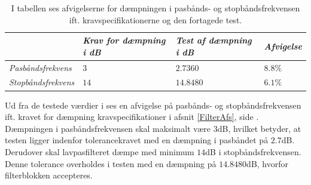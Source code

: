 \begin{table}[H]
	\centering
	\begin{tabular}{|l|l|l|l|}
		\hline
		& \textit{Krav for dæmpning i dB} 	& \textit{Test af dæmpning i dB}  &\textit{Afvigelse} \\ \hline
		\textit{Pasbåndsfrekvens} & $3$	& $2.7360$	    & $8.8\%$ \\ \hline
		\textit{Stopbåndsfrekvens} & $14$    & $14.8480$    & $6.1\%$  \\ \hline
	\end{tabular}
	\caption{I tabellen ses afvigelserne for dæmpningen i pasbånds- og stopbåndsfrekvensen ift. kravspecifikationerne og den fortagede test.}
	\label{Tab:Tolerance}
\end{table}
\noindent Ud fra de testede værdier i  ses en afvigelse på pasbånds- og stopbåndsfrekvensen ift. kravet for dæmpning kravspecifikationer i afsnit \ref{FilterAfs}, side \pageref{FilterAfs}. Dæmpningen i pasbåndsfrekvensen skal maksimalt være $3$dB, hvilket betyder, at testen ligger indenfor tolerancekravet med en dæmpning i pasbåndet på $2.7$dB. Derudover skal lavpasfilteret dæmpe med minimum $14$dB i stopbåndsfrekvensen. Denne tolerance overholdes i testen med en dæmpning på $14.8480$dB, hvorfor filterblokken accepteres.\\

